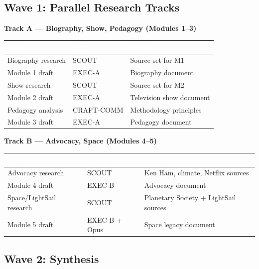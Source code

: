 \documentclass[11pt,letterpaper]{article}
\newcommand{\tableheader}[1]{\textbf{\sffamily\textcolor{white}{#1}}}
\begin{document}
\subsection{Wave 1: Parallel Research Tracks}

\textbf{Track A --- Biography, Show, Pedagogy (Modules 1--3)}

\begin{center}
\begin{tabularx}{\textwidth}{L{2.5cm}L{2cm}X}
\toprule
{}
\tableheader{Task} & \tableheader{Agent} & \tableheader{Output} \\
\midrule
Biography research & SCOUT & Source set for M1 \\
Module 1 draft & EXEC-A & Biography document \\
Show research & SCOUT & Source set for M2 \\
Module 2 draft & EXEC-A & Television show document \\
Pedagogy analysis & CRAFT-COMM & Methodology principles \\
Module 3 draft & EXEC-A & Pedagogy document \\
\bottomrule
\end{tabularx}
\end{center}

\textbf{Track B --- Advocacy, Space (Modules 4--5)}

\begin{center}
\begin{tabularx}{\textwidth}{L{2.5cm}L{2cm}X}
\toprule
{}
\tableheader{Task} & \tableheader{Agent} & \tableheader{Output} \\
\midrule
Advocacy research & SCOUT & Ken Ham, climate, Netflix sources \\
Module 4 draft & EXEC-B & Advocacy document \\
Space/LightSail research & SCOUT & Planetary Society + LightSail sources \\
Module 5 draft & EXEC-B + Opus & Space legacy document \\
\bottomrule
\end{tabularx}
\end{center}

\subsection{Wave 2: Synthesis}
\end{document}

